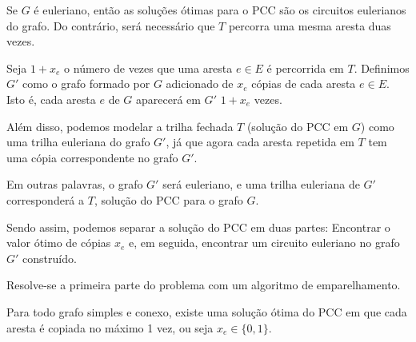 Se $G$ é euleriano, então as soluções ótimas para o PCC são os circuitos eulerianos do grafo.
Do contrário, será necessário que $T$ percorra uma mesma aresta duas vezes.

Seja $1 + x_e$ o número de vezes que uma aresta $e \in E$ é percorrida em $T$.
Definimos $G'$ como o grafo formado por $G$ adicionado de $x_e$ cópias de cada aresta $e \in E$. 
Isto é, cada aresta $e$ de $G$ aparecerá em $G'$ $1 + x_e$ vezes. 

Além disso, podemos modelar a trilha fechada $T$ (solução do PCC em $G$) como uma trilha euleriana do grafo $G'$, já que agora cada aresta repetida em  $T$ tem uma cópia correspondente no grafo $G'$. 

Em outras palavras, o grafo $G'$ será euleriano, e uma trilha euleriana de $G'$ corresponderá a $T$, solução do PCC para o grafo $G$.

Sendo assim, podemos separar a solução do PCC em duas partes: Encontrar o valor ótimo de cópias $x_e$ e, em seguida, encontrar um circuito euleriano no grafo $G'$ construído.

Resolve-se a primeira parte do problema com um algoritmo de emparelhamento.



\begin{lemma} 
    \label{lemma-pcc}
    Para todo grafo simples e conexo, existe uma solução ótima do PCC em que cada aresta é copiada no máximo 1 vez, ou seja $x_e \in \{0, 1\}$. 
\end{lemma}

